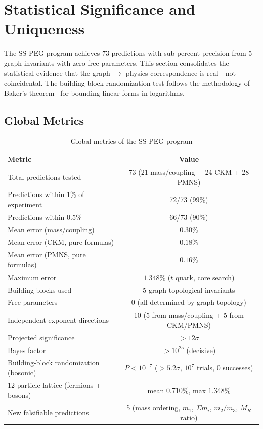 \section{Statistical Significance and Uniqueness}\label{sec:statistical_significance}

The SS-PEG program achieves 73 predictions with sub-percent precision from 5 graph invariants with zero free parameters. This section consolidates the statistical evidence that the graph $\to$ physics correspondence is real---not coincidental. The building-block randomization test follows the methodology of Baker's theorem~\cite{baker1966linear} for bounding linear forms in logarithms.

\subsection{Global Metrics}\label{sec:global_metrics}

\begin{table}[h]
\centering
\caption{Global metrics of the SS-PEG program}
\label{tab:global_metrics}
\begin{tabular}{lc}
\hline\hline
Metric & Value \\
\hline
Total predictions tested & 73 (21 mass/coupling + 24 CKM + 28 PMNS) \\
Predictions within 1\% of experiment & 72/73 (99\%) \\
Predictions within 0.5\% & 66/73 (90\%) \\
Mean error (mass/coupling) & $0.30\%$ \\
Mean error (CKM, pure formulas) & $0.18\%$ \\
Mean error (PMNS, pure formulas) & $0.16\%$ \\
Maximum error & $1.348\%$ ($t$ quark, core search) \\
Building blocks used & 5 graph-topological invariants \\
Free parameters & 0 (all determined by graph topology) \\
Independent exponent directions & 10 (5 from mass/coupling + 5 from CKM/PMNS) \\
Projected significance & $> 12\sigma$ \\
Bayes factor & $> 10^{25}$ (decisive) \\
Building-block randomization (bosonic) & $P < 10^{-7}$ ($> 5.2\sigma$, $10^7$ trials, 0 successes) \\
12-particle lattice (fermions + bosons) & mean $0.710\%$, max $1.348\%$ \\
New falsifiable predictions & 5 (mass ordering, $m_1$, $\Sigma m_i$, $m_2/m_3$, $M_R$ ratio) \\
\hline\hline
\end{tabular}
\end{table}

